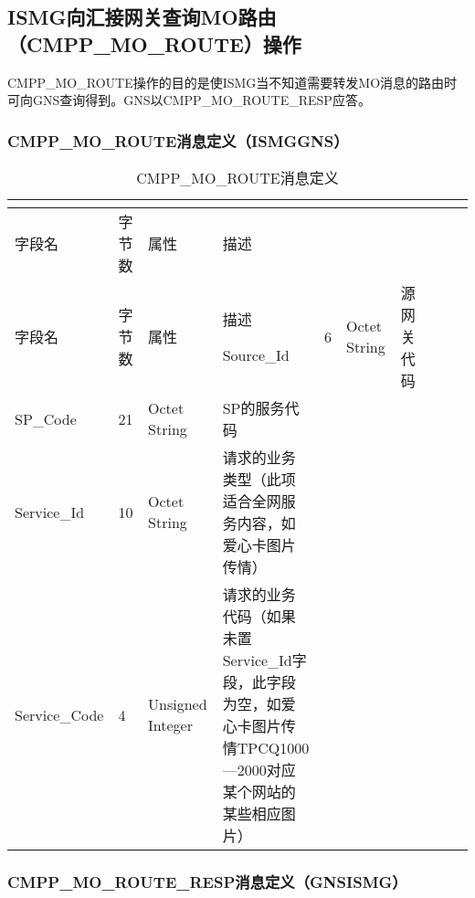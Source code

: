 \documentclass[11pt]{book} %
\begin{document}
\subsection{ISMG向汇接网关查询MO路由（CMPP\_MO\_ROUTE）操作}

CMPP\_MO\_ROUTE操作的目的是使ISMG当不知道需要转发MO消息的路由时可向GNS查询得到。GNS以CMPP\_MO\_ROUTE\_RESP应答。


%
%
%
%
%



\subsubsection{CMPP\_MO\_ROUTE消息定义（ISMG\textrightarrow GNS）}


\begin{longtable}{|m{90pt}|m{35pt}|m{80pt}|m{200pt}|}
\tabularnewline\hline
字段名&字节数&属性&描述
\endhead

\caption{CMPP\_MO\_ROUTE消息定义}\\
\hline
字段名&字节数&属性&描述
\endfirsthead

\endfoot

\endlastfoot

\hline
Source\_Id&6&Octet String&源网关代码\\
\hline
SP\_Code&21&Octet String&SP的服务代码\\
\hline
Service\_Id&10&Octet String&请求的业务类型（此项适合全网服务内容，如爱心卡图片传情）\\
\hline
Service\_Code&4&Unsigned Integer&请求的业务代码\newline （如果未置Service\_Id字段，此字段为空，如爱心卡图片传情TPCQ1000—2000对应某个网站的某些相应图片）\\
\hline
\end{longtable}



\subsubsection{CMPP\_MO\_ROUTE\_RESP消息定义（GNS\textrightarrow ISMG）}
\end{document}
